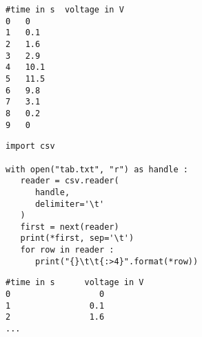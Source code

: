 \begin{frame}[fragile]
%
\begin{tcbraster}[raster columns=2,
                  raster equal height,
                  nobeforeafter,
                  raster column skip=0.2cm]
\begin{cmdbox}
\begin{verbatim}
#time in s	voltage in V
0	0
1	0.1
2	1.6
3	2.9
4	10.1
5	11.5
6	9.8
7	3.1
8	0.2
9	0
\end{verbatim}
\end{cmdbox}
%
\begin{codebox}
\begin{verbatim}
import csv

with open("tab.txt", "r") as handle :
   reader = csv.reader(
      handle,
      delimiter='\t'
   )
   first = next(reader)
   print(*first, sep='\t')
   for row in reader :
      print("{}\t\t{:>4}".format(*row))
\end{verbatim}
\end{codebox}
\end{tcbraster}
%
\begin{cmdbox}
\begin{verbatim}
#time in s      voltage in V
0                  0
1                0.1
2                1.6
...
\end{verbatim}
\end{cmdbox}
%
\end{frame}


